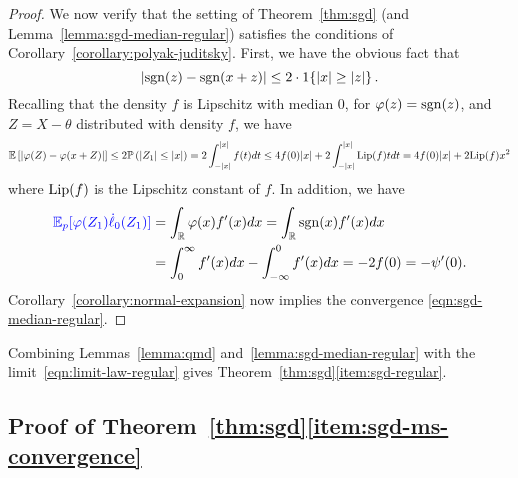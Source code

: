 \begin{proof}
  We now verify that the setting of Theorem~\ref{thm:sgd}
  (and Lemma~\ref{lemma:sgd-median-regular}) satisfies the
  conditions of Corollary~\ref{corollary:polyak-juditsky}. First, we have
  the obvious fact that
  \begin{equation*}
    |\mathrm{sgn}(z) - \mathrm{sgn}(x + z)|
    \le 2 \cdot 1\!\left\{|x| \ge |z|\right\}.
  \end{equation*}
  Recalling that the density $f$ is Lipschitz with median 0,
  for $\varphi(z) = \mathrm{sgn}(z)$, and $Z = X - \theta$ distributed with
  density $f$, we have
  \begin{align*}
    \mathbb{E}\left[  \left| \varphi(Z) - \varphi(x + Z) \right| \right]
    \leq 2 \mathbb{P}\left( |Z_1| \le |x|  \right)
    = 2 \int_{-|x|}^{|x|} f(t) dt
    \le 4 f(0)|x| + 2 \int_{-|x|}^{|x|}
    {\rm \textup{Lip}}(f) t dt
    = 4 f(0) |x| + 2 {\rm \textup{Lip}}(f) x^2
  \end{align*}
  where ${\rm \textup{Lip}}(f)$ is the Lipschitz constant of $f$.
  In addition, we have
  \begin{align*}
{\color{blue} { \mathbb{E}_p[\varphi(Z_1) \dot{\ell}_0(Z_1)] }} & = 
    \int_{\mathbb{R}} \varphi(x) f'(x ) dx
    = \int_{\mathbb{R}} \mathrm{sgn}(x) f'(x ) dx\\
     &  =
    \int_0^\infty f'(x ) dx
    - \int_{-\infty}^0 f'(x ) dx
    = -2 f(0) = -\psi'(0).
  \end{align*}
  Corollary~\ref{corollary:normal-expansion}
  now implies the convergence \eqref{eqn:sgd-median-regular}.
\end{proof}

Combining Lemmas~\ref{lemma:qmd} and~\ref{lemma:sgd-median-regular}
with the limit~\eqref{eqn:limit-law-regular} gives
Theorem~\ref{thm:sgd}\eqref{item:sgd-regular}.

\subsection{Proof of Theorem~\ref{thm:sgd}\eqref{item:sgd-ms-convergence}}
\label{sec:proof-sgd-ms-convergence}

